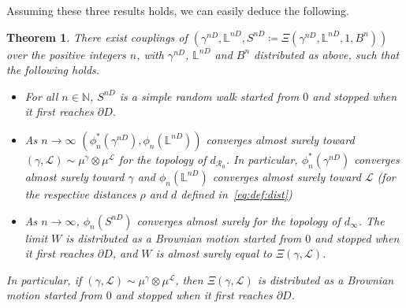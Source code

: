 \documentclass[11pt]{article}
\newtheorem{theorem}{Theorem}[section]
\def\Conf{{\mathscr{R}}}
\def\Att{{\Xi}}
\begin{document}
Assuming these three results holds, we can easily deduce the following.
\begin{theorem}
  \label{th:main}
  There exist couplings of $(\gamma^{nD},\mathbb{L}^{nD},S^{nD}\coloneqq \Att(\gamma^{nD},\mathbb{L}^{nD},1,B^n ))$ over the positive integers $n$, with
$\gamma^{nD}$, $\mathbb{L}^{nD}$ and $B^n$ distributed as above, such that the following holds.
  \begin{itemize}
  \item For all $n\in \mathbb{N}$, $S^{nD}$ is a simple random walk started from $0$ and stopped when it first reaches $\partial D$.
  \item As $n\to \infty$
  $(\phi^*_n(\gamma^{nD}),\phi_n(\mathbb{L}^{nD}) )$ converges almost surely toward $(\gamma,\mathcal{L})\sim \mu^\gamma\otimes \mu^{\mathcal{L}}$ for the topology of $d_{\Conf_0}$. In particular,
  $\phi^*_n(\gamma^{nD})$ converges almost surely toward $\gamma$ and
  $\phi_n(\mathbb{L}^{nD})$ converges almost surely toward $\mathcal{L}$ (for the respective distances $\rho$ and $d$ defined in~\eqref{eq:def:dist})
  \item As $n\to \infty$, $\phi_n(S^{nD})$
  converges almost surely for the topology of $d_\infty$.  The limit $W$ is distributed as a Brownian motion started from $0$ and stopped when it first reaches $\partial D$, and $W$ is almost surely equal to $\Att(\gamma, \mathcal{L})$.
  \end{itemize}
  In particular, if $(\gamma, \mathcal{L})\sim \mu^\gamma\otimes \mu^{\mathcal{L}}$, then
  $\Att(\gamma, \mathcal{L})$ is distributed as a Brownian motion started from $0$ and stopped when it first reaches $\partial D$.
\end{theorem}
\end{document}
